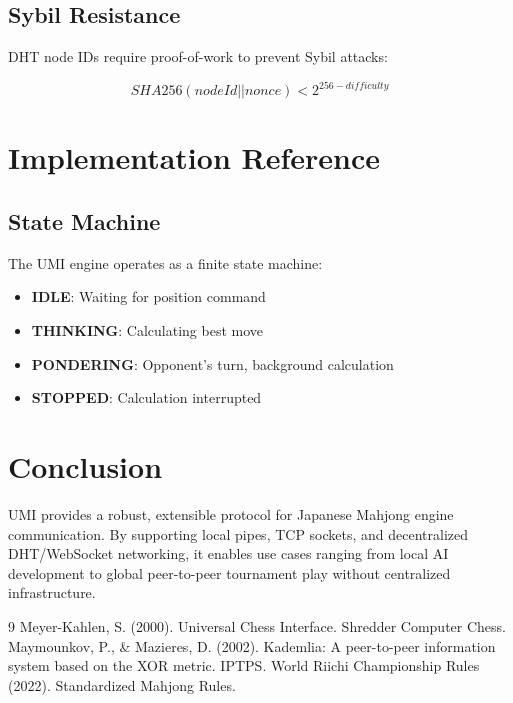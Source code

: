 \documentclass[11pt,a4paper]{article}
\begin{document}
\subsection{Sybil Resistance}

DHT node IDs require proof-of-work to prevent Sybil attacks:

\begin{equation}
SHA256(nodeId || nonce) < 2^{256 - difficulty}
\end{equation}

\section{Implementation Reference}

\subsection{State Machine}

The UMI engine operates as a finite state machine:

\begin{itemize}
    \item \textbf{IDLE}: Waiting for position command
    \item \textbf{THINKING}: Calculating best move
    \item \textbf{PONDERING}: Opponent's turn, background calculation
    \item \textbf{STOPPED}: Calculation interrupted
\end{itemize}

\section{Conclusion}

UMI provides a robust, extensible protocol for Japanese Mahjong engine communication. By supporting local pipes, TCP sockets, and decentralized DHT/WebSocket networking, it enables use cases ranging from local AI development to global peer-to-peer tournament play without centralized infrastructure.

\begin{thebibliography}{9}
 Meyer-Kahlen, S. (2000). Universal Chess Interface. Shredder Computer Chess.
 Maymounkov, P., \& Mazieres, D. (2002). Kademlia: A peer-to-peer information system based on the XOR metric. IPTPS.
 World Riichi Championship Rules (2022). Standardized Mahjong Rules.
\end{thebibliography}
\end{document}
